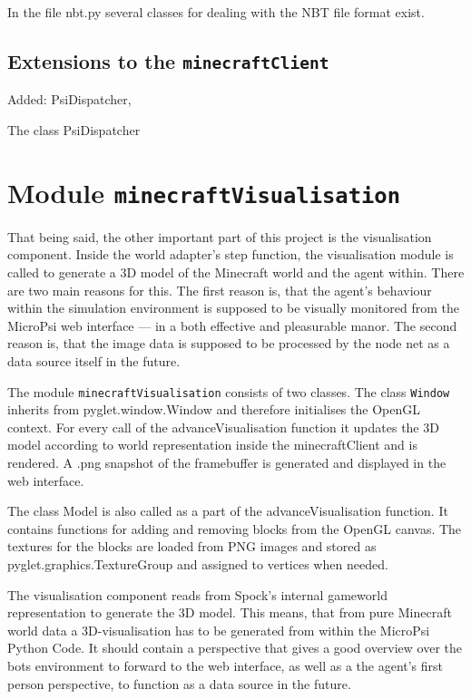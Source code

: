 In the file nbt.py several classes for dealing with the NBT file format exist.

        \subsection{Extensions to the \texttt{minecraftClient}}
Added: PsiDispatcher,
        
The class PsiDispatcher

    \section{Module \texttt{minecraftVisualisation}}
That being said, the other important part of this project is the visualisation component. Inside the world adapter's step function, the visualisation module is called to generate a 3D model of the Minecraft world and the agent within. There are two main reasons for this. The first reason is, that the agent's behaviour within the simulation environment is supposed to be visually monitored from the MicroPsi web interface --- in a both effective and pleasurable manor. The second reason is, that the image data is supposed to be processed by the node net as a data source itself in the future.

The module \texttt{minecraftVisualisation} consists of two classes. The class \texttt{Window} inherits from pyglet.window.Window and therefore initialises the OpenGL context. For every call of the advanceVisualisation function it updates the 3D model according to world representation inside the minecraftClient and is rendered. A .png snapshot of the framebuffer is generated and displayed in the web interface.

The class Model is also called as a part of the advanceVisualisation function. It contains functions for adding and removing blocks from the OpenGL canvas. The textures for the blocks are loaded from PNG images and stored as pyglet.graphics.TextureGroup and assigned to vertices when needed.

The visualisation component reads from Spock's internal gameworld representation to generate the 3D model. This means, that from pure Minecraft world data a 3D-visualisation has to be generated from within the MicroPsi Python Code. It should contain a perspective that gives a good overview over the bots environment to forward to the web interface, as well as a the agent's first person perspective, to function as a data source in the future.  

